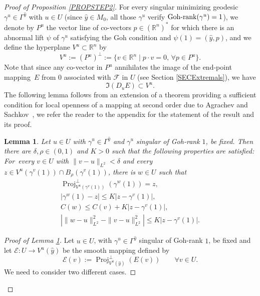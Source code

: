 \documentclass[JEP,XML,SOM,Unicode,NoFloatCountersInSection,published]{cedram}
\let\sep\mid
\DeclareMathOperator{\Gohrank}{Goh\textup{-}rank}
\DeclareMathOperator{\Proj}{Proj}
\newcommand\R{\mathbb R}
\newtheorem{lemma}[theorem]{Lemma}
\theoremstyle{definition}
\begin{document}
\begin{proof}[Proof of Proposition \ref{PROPSTEP2}]
For every singular minimizing geodesic $\gamma^u \in \Gamma^{\hat{y}}$ with $u\in U$ (since $\hat{y}\in M_0$, all those $\gamma^u$ verify $\Gohrank(\gamma^u)= 1$), we denote by $P^u$ the vector line of co-vectors $p\in (\R^n)^*$ for which there is an abnormal lift $\psi$ of $\gamma^u$ satisfying the Goh condition and $\psi(1)=(\hat{y},p)$, and we define the hyperplane $V^u\subset \R^n$ by
\begin{equation}\label{10oct2}
V^{u} := \left(P^{u}\right)^{\perp} := \bigl\{ v \in \R^n \sep  p\cdot v=0, \, \forall p \in P^{u} \bigr\}.
\end{equation}
Note that since any co-vector in $P^{u}$ annihilates the image of the end-point mapping~$E$ from $0$ associated with $\mathcal{F}$ in $U$ (see Section \ref{SECExtremals}), we have
\begin{equation}\label{21oct7}
\Im \left(D_{u}E\right) \subset V^{u}.
\end{equation}
The following lemma follows from an extension of a theorem providing a sufficient condition for local openness of a mapping at second order due to Agrachev and Sachkov~\cite{as04}, we refer the reader to the appendix for the statement of the result and its proof.

\begin{lemma}\label{STEP2_LEM3}
Let $u \in U$ with $\gamma^u \in \Gamma^{\hat{y}}$ and $\gamma^u$ singular of Goh-rank $1$, be fixed. Then there are $\delta, \rho \in (0,1)$ and $K>0$ such that the following properties are satisfied: For~every $v\in U$ with $\|v-u\|_{L^2} < \delta$ and every $z\in V^{u}(\gamma^v(1)) \cap B_{\rho}(\gamma^v(1))$, there is $w \in U$ such that
\begin{gather}\label{STEP2_LEM3_1}
\Proj_{V^{u}(\gamma^v(1))}^{\perp} \left(\gamma^{w}(1)\right)=z,
\\
\label{STEP2_LEM3_2}
\left| \gamma^w(1)-z \right| \leq K \left| z-\gamma^v(1)\right|,
\\
\label{STEP2_LEM3_3}
C(w) \leq C(v) + K \left|z - \gamma^v(1)\right|,
\\
\label{STEP2_LEM3_4}
\left|\| w-u\|_{L^2}^2 - \| v-u\|_{L^2}^2\right| \leq K \left| z-\gamma^v(1)\right|.
\end{gather}
\end{lemma}

\begin{proof}[Proof of Lemma \ref{STEP2_LEM3}]
Let $u \in U$, with $\gamma^u \in \Gamma^{\hat{y}}$ singular of Goh-rank $1$, be fixed and let $\mathcal{E}:U \to V^u(\hat{y})$ be the smooth mapping defined by
\[
\mathcal{E}(v) := \Proj_{V^u(\hat{y})}^{\perp} \left(E(v) \right) \qquad \forall v \in U.
\]
We need to consider two different cases.


\end{proof}
\end{proof}
\end{document}
